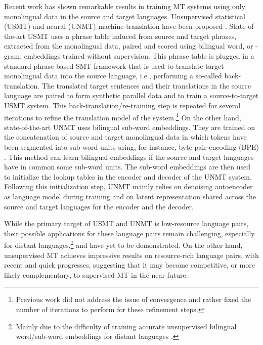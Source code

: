 \documentclass[11pt,a4paper]{article}
\begin{document}
Recent work has shown remarkable results in training MT systems using only monolingual data in the source and target languages.  Unsupervised statistical (USMT) and neural (UNMT) machine translation have been proposed \citep{artetxe2018unsupervised,DBLP:journals/corr/abs-1804-07755}. 
State-of-the-art USMT \citep{artetxe2018unsupervised,DBLP:journals/corr/abs-1804-07755} uses a phrase table induced from source and target phrases, extracted from the monolingual data, paired and scored using bilingual word, or -gram, embeddings trained without supervision. This phrase table is plugged in a standard phrase-based SMT framework that is used to translate target monolingual data into the source language, i.e., performing a so-called back-translation. The translated target sentences and their translations in the source language are paired to form synthetic parallel data and to train a source-to-target USMT system.  This back-translation/re-training step is repeated for several iterations to refine the translation model of the system.\footnote{Previous work did not address the issue of convergence and rather fixed the number of iterations to perform for these refinement steps.}
On the other hand, state-of-the-art UNMT \citep{DBLP:journals/corr/abs-1804-07755} uses bilingual sub-word embeddings. They are trained on the concatenation of source and target monolingual data in which tokens have been segmented into sub-word units using, for instance, byte-pair-encoding (BPE) \citep{sennrich-haddow-birch:2016:P16-12}. This method can learn bilingual embeddings if the source and target languages have in common some sub-word units. The sub-word embeddings are then used to initialize the lookup tables in the encoder and decoder of the UNMT system. Following this initialization step, UNMT mainly relies on denoising autoencoder as language model during training and on latent representation shared across the source and target languages for the encoder and the decoder.

While the primary target of USMT and UNMT is low-resource language pairs, their possible applications for these language pairs remain challenging, especially for distant languages,\footnote{Mainly due to the difficulty of training accurate unsupervised bilingual word/sub-word embeddings for distant languages \citep{P18-1072}.} and have yet to be demonstrated. On the other hand, unsupervised MT achieves impressive results on resource-rich language pairs, with recent and quick progresses, suggesting that it may become competitive, or more likely complementary, to supervised MT in the near future.
\end{document}
